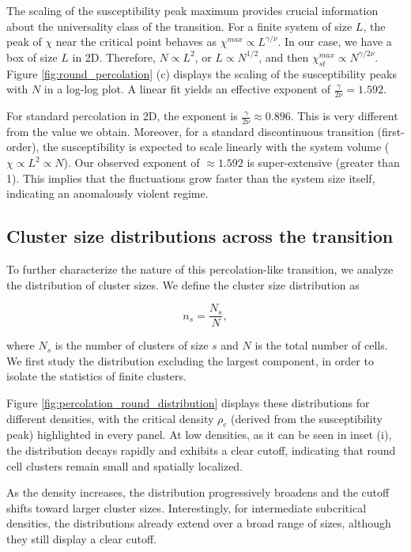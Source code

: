 \documentclass[%
reprint,
amsmath,amssymb,
aps,
]{revtex4-2}
\begin{document}
	
	The scaling of the susceptibility peak maximum provides crucial information about the universality class of the transition. For a finite system of size $L$, the peak of $\chi$ near the critical point behaves as $\chi^{max} \propto L^{\gamma/\nu}$. In our case, we have a box of size $L$ in 2D. Therefore, $N \propto L^{2}$, or $L \propto N^{1/2}$, and then $\chi_{st}^{max} \propto N^{\gamma/2\nu}$. Figure \ref{fig:round_percolation} (c) displays the scaling of the susceptibility peaks with $N$ in a log-log plot. A linear fit yields an effective exponent of $\frac{\gamma}{2\nu}=1.592$.
	

	For standard percolation in 2D, the exponent is $\frac{\gamma}{2\nu} \approx 0.896$. This is very different from the value we obtain. Moreover, for a standard discontinuous transition (first-order), the susceptibility is expected to scale linearly with the system volume ($\chi \propto L^{2}\propto N$). Our observed exponent of $\approx 1.592$ is super-extensive (greater than 1). This implies that the fluctuations grow faster than the system size itself, indicating an anomalously violent regime.
	
	\subsection{Cluster size distributions across the transition}

	To further characterize the nature of this percolation-like transition, we analyze the distribution of cluster sizes. We define the cluster size distribution as
	
	$$
	n_s=\frac{N_s}{N},
	$$
	
	where $N_s$ is the number of clusters of size $s$ and $N$ is the total number of cells. We first study the distribution excluding the largest component, in order to isolate the statistics of finite clusters.
		
	Figure \ref{fig:percolation_round_distribution} displays these distributions for different densities, with the critical density $\rho_c$ (derived from the susceptibility peak) highlighted in every panel. At low densities, as it can be seen in inset (i), the distribution decays rapidly and exhibits a clear cutoff, indicating that round cell clusters remain small and spatially localized.
	
	As the density increases, the distribution progressively broadens and the cutoff shifts toward larger cluster sizes. Interestingly, for intermediate subcritical densities, the distributions already extend over a broad range of sizes, although they still display a clear cutoff.
\end{document}
